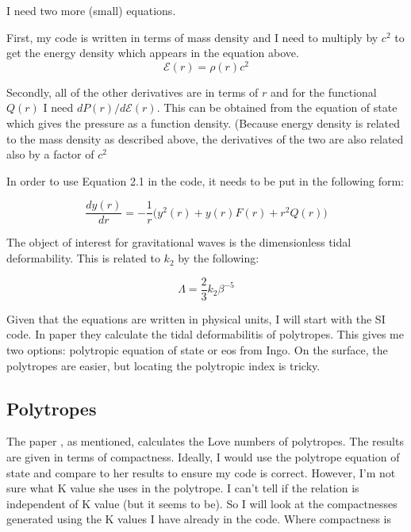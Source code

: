 \documentclass[11pt]{article}
\numberwithin{equation}{section}
\begin{document}
I need two more (small) equations.

First, my code is written in terms of mass density and I need to multiply by $c^2$ to get the energy density which appears in the equation above.  
\begin{equation}
\mathcal{E}(r) = \rho (r) c^{2}
\end{equation}

Secondly, all of the other derivatives are in terms of $r$ and for the functional $Q(r)$ I need $dP(r)/d\mathcal{E}(r)$.  This can be obtained from the equation of state which gives the pressure as a function density.  (Because energy density is related to the mass density as described above, the derivatives of the two are also related also by a factor of $c^{2}$


In order to use Equation 2.1 in the code, it needs to be put in the following form:


\begin{equation}
\frac{dy(r)}{dr} = - \frac{1}{r} \bigg( y^{2}(r) + y(r) F(r) + r^{2} Q(r)  \bigg)
\end{equation}

The object of interest for gravitational waves is the dimensionless tidal deformability.  This is related to $k_2$ by the following:

\begin{equation}
\Lambda = \frac{2}{3} k_{2} \beta^{-5}
\end{equation}


Given that the equations are written in physical units, I will start with the SI code.  In paper \cite{Hinderer_2008} they calculate the tidal deformabilitis of polytropes.  This gives me two options: polytropic equation of state or eos from Ingo.  On the surface, the polytropes are easier, but locating the polytropic index is tricky.  



\subsection{Polytropes}

The paper \cite{Hinderer_2008}, as mentioned, calculates the Love numbers of polytropes.  The results are given in terms of compactness.  Ideally, I would use the polytrope equation of state and compare to her results to ensure my code is correct.  However, I'm not sure what K value she uses in the polytrope.  I can't tell if the relation is independent of K value (but it seems to be).  So I will look at the compactnesses generated using the K values I have already in the code.  Where compactness is 
\end{document}
